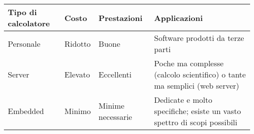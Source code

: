 \documentclass{standalone}
\newcommand\lightrule{%
	\arrayrulecolor{black!30}%
	\midrule[\lightrulewidth]%
	\arrayrulecolor{black}}
\begin{document}
\begin{tabular}{ p{3.5cm}p{1.5cm}p{2cm}p{4cm} }
	\toprule
		Tipo di calcolatore & Costo & Prestazioni & Applicazioni\\
	\midrule
		Personale & Ridotto & Buone & Software prodotti da terze parti\\\lightrule
		Server & Elevato & Eccellenti & Poche ma complesse (calcolo scientifico) o tante ma semplici (web server)\\\lightrule
		Embedded & Minimo & Minime necessarie & Dedicate e molto specifiche; esiste un vasto spettro di scopi possibili\\
	\bottomrule
\end{tabular}
\end{document}
